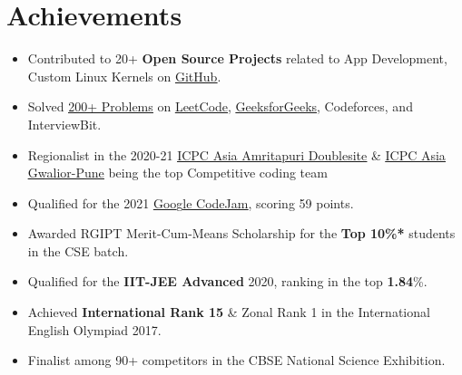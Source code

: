 \documentclass[letterpaper,10.5pt]{article}
\newcommand{\resumeItemWithoutTitle}[1]{
  \item\small{
  {#1 \vspace{-2pt}}
    {\vspace{-2pt}}
  }
}
\newcommand{\resumeSubHeadingListStart}{\begin{itemize}[leftmargin=*]}
\newcommand{\resumeSubHeadingListEnd}{\end{itemize}}
\begin{document}
\section{Achievements}
\resumeSubHeadingListStart
\resumeItemWithoutTitle
{Contributed to 20+ \textbf{Open Source Projects} related to App Development, Custom Linux Kernels on \href{https://github.com/ayushr1}{\underline{GitHub}}.}

\resumeItemWithoutTitle
{Solved \href{https://github.com/AyushR1/DSA-QA/}{\underline{200+ Problems}}  on 
\href{https://leetcode.com/AyushR1/}{\underline{LeetCode}}, 
\href{https://auth.geeksforgeeks.org/user/ayushr1_gfg}{\underline{GeeksforGeeks}}, Codeforces, and InterviewBit.}
\resumeItemWithoutTitle
{Regionalist in the 2020-21 \href{https://drive.google.com/file/d/166f0APz01XpxkFRC2Jj-MZfdezvqN_cL/view?usp=sharing}{{\underline{ICPC Asia Amrita}p{\underline{uri Doublesite}}}} \& \href{https://drive.google.com/file/d/12iHnk-QTFNEFMlT0RtzUQPJx-VE-aazo/view?usp=sharing}{\underline{ICPC Asia Gwalior-Pune}} being the top Competitive coding team}
\resumeItemWithoutTitle
{Qualified 
for the 2021 \href{https://drive.google.com/file/d/1dZ_wFBDmbI-wAKbAvBAo_n1-ssqiqFjs/view?usp=sharing}{{\underline{Goo}g{\underline{le CodeJam}}}}, scoring 59 points.}
\resumeItemWithoutTitle
{Awarded RGIPT Merit-Cum-Means Scholarship for the \textbf{Top 10\%*} students in the CSE batch. }
\resumeItemWithoutTitle
{Qualified for the \textbf{IIT-JEE Advanced} 2020, ranking in the top \textbf{1.84}\%.}
\resumeItemWithoutTitle
{Achieved \textbf{{International Rank 15}} \& Zonal Rank 1 in the  International English Olympiad 2017.}
\resumeItemWithoutTitle
{Finalist among 90+ competitors in the CBSE National Science Exhibition.}
\resumeSubHeadingListEnd
\end{document}
